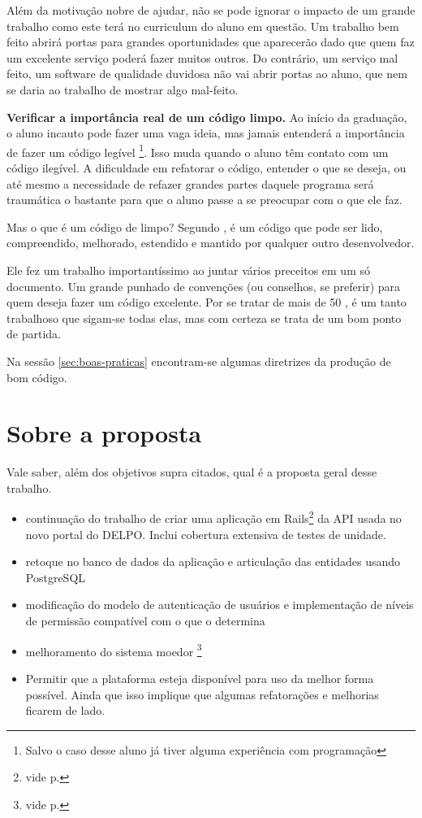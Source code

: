 Além da motivação nobre de ajudar, não se pode ignorar o impacto de um grande trabalho como
este terá no curriculum do aluno em questão. Um trabalho bem feito abrirá portas para grandes
oportunidades que aparecerão dado que quem faz um excelente serviço poderá fazer muitos outros.
Do contrário, um serviço mal feito, um software de qualidade duvidosa não vai abrir portas ao
aluno, que nem se daria ao trabalho de mostrar algo mal-feito.

\textbf{Verificar a importância real de um código limpo.} Ao início da graduação, o aluno incauto
pode fazer uma vaga ideia, mas jamais entenderá a importância de fazer um código legível
\footnote{Salvo o caso desse aluno já tiver alguma experiência com programação}. Isso muda quando
o aluno têm contato com um código ilegível. A dificuldade em refatorar o código, entender o que se
deseja, ou até mesmo a necessidade de refazer grandes partes daquele programa será traumática o
bastante para que o aluno passe a se preocupar com o que ele faz.

Mas o que é um código de limpo? Segundo \citeauthor{CCL}, é um código que pode ser lido, compreendido,
melhorado, estendido e mantido por qualquer outro desenvolvedor.

Ele fez um trabalho importantíssimo ao juntar vários preceitos em um só documento. Um grande punhado
de convenções (ou conselhos, se preferir) para quem deseja fazer um código excelente. Por se tratar de
mais de 50 , é um tanto trabalhoso que sigam-se todas elas, mas com certeza se trata de um bom
ponto de partida.

Na sessão \ref{sec:boas-praticas} encontram-se algumas diretrizes da produção de bom código.

\section{Sobre a proposta} \label{sec:proposta}

Vale saber, além dos objetivos supra citados, qual é a proposta geral desse trabalho.
\begin{itemize}
    \item continuação do trabalho de criar uma aplicação em Rails\footnote{vide p.\pageref{subsec:rails}}
    da API usada no novo portal do DELPO. Inclui cobertura extensiva de testes de unidade.
    \item retoque no banco de dados da aplicação e articulação das entidades usando PostgreSQL
    \item modificação do modelo de autenticação de usuários e implementação de níveis de permissão compatível
    com o que o  determina
    \item melhoramento do sistema moedor \footnote{vide p.\pageref{subsec:moagem}}
    \item Permitir que a plataforma esteja disponível para uso da melhor forma possível. Ainda que isso
    implique que algumas refatorações e melhorias ficarem de lado.
\end{itemize}

